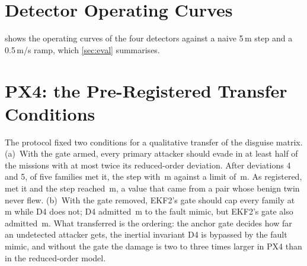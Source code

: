 \section{Detector Operating Curves}
\label{app:roc}
 shows the operating curves of the four detectors against a naive
5\,m step and a 0.5\,m/s ramp, which \cref{sec:eval} summarises.

\figROC

\section{PX4: the Pre-Registered Transfer Conditions}
\label{app:px4read}
The protocol fixed two conditions for a qualitative transfer of the disguise
matrix. (a)~With the gate armed, every primary attacker should evade in at least
half of the missions with at most twice its reduced-order deviation. After
deviations 4 and 5, \nPxReadAOk{} of five families met it, the step with
\nPxReadStepDev\,m against a limit of \nPxReadStepLim\,m. As registered,
\nPxReadAOkReg{} met it and the step reached \nPxReadStepDevReg\,m, a value that
came from a pair whose benign twin never flew. (b)~With the gate removed, EKF2's
gate should cap every family at \nPxReadCap\,m while D4 does not; D4 admitted
\nPxReadFaultDFour\,m to the fault mimic, but EKF2's gate also admitted
\nPxReadFaultDTwo\,m. What transferred is the ordering: the anchor gate decides
how far an undetected attacker gets, the inertial invariant D4 is bypassed by the
fault mimic, and without the gate the damage is two to three times larger in PX4
than in the reduced-order model.

